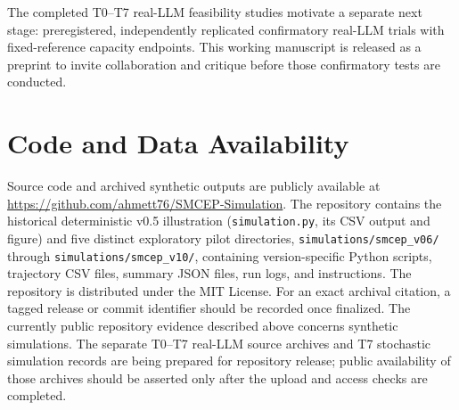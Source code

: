 \documentclass[11pt,a4paper]{article}
\begin{document}
The completed T0--T7 real-LLM feasibility studies motivate a separate next stage: preregistered, independently replicated confirmatory real-LLM trials with fixed-reference capacity endpoints. This working manuscript is released as a preprint to invite collaboration and critique before those confirmatory tests are conducted.



\section{Code and Data Availability}
Source code and archived synthetic outputs are publicly available at \url{https://github.com/ahmett76/SMCEP-Simulation}. The repository contains the historical deterministic v0.5 illustration (\texttt{simulation.py}, its CSV output and figure) and five distinct exploratory pilot directories, \texttt{simulations/smcep\_v06/} through \texttt{simulations/smcep\_v10/}, containing version-specific Python scripts, trajectory CSV files, summary JSON files, run logs, and instructions. The repository is distributed under the MIT License. For an exact archival citation, a tagged release or commit identifier should be recorded once finalized. The currently public repository evidence described above concerns synthetic simulations. The separate T0--T7 real-LLM source archives and T7 stochastic simulation records are being prepared for repository release; public availability of those archives should be asserted only after the upload and access checks are completed.
\end{document}
